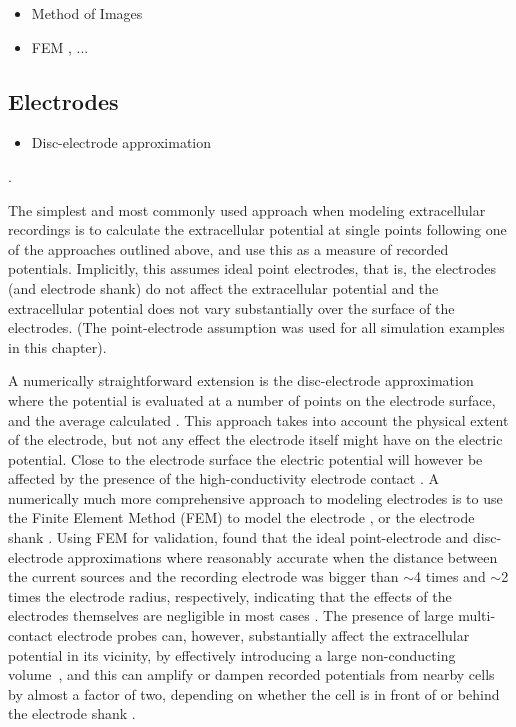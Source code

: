 \begin{itemize}
\item Method of Images \citep{Ness2015}
\item FEM \citep{Ness2015}, ...
\end{itemize}


\subsection{Electrodes}
\label{sec:electrode}
\begin{itemize}
\item Disc-electrode approximation
\end{itemize}
. 

The simplest and most commonly used approach when modeling extracellular recordings is to calculate the extracellular potential at single points following one of the approaches outlined above, and use this as a measure of recorded potentials. Implicitly, this assumes ideal point electrodes, that is, the electrodes (and electrode shank) do not affect the extracellular potential and the extracellular potential does not vary substantially over the surface of the electrodes. (The point-electrode assumption was used for all simulation examples in this chapter).

A numerically straightforward extension is the disc-electrode approximation where the potential is evaluated at a number of points on the electrode surface, and the average calculated \citep{ Linden2014}. 
This approach takes into account the physical extent of the electrode, but not any effect the electrode itself might have on the electric potential. 
Close to the electrode surface the electric potential will however be affected by the presence of the high-conductivity electrode contact \citep{McIntyre2001, Moulin2008}. A numerically much more comprehensive approach to modeling electrodes is to use the Finite Element Method (FEM) to model the electrode \citep{Moulin2008, Ness2015}, or the electrode shank \citep{Moffitt2005, Buccino2019b}. Using FEM for validation, \cite{Ness2015} found that the ideal point-electrode and disc-electrode approximations where reasonably accurate when the distance between the current sources and the recording electrode was bigger than $\sim$4 times and $\sim$2 times the electrode radius, respectively, indicating that the effects of the electrodes themselves are negligible in most cases \citep{Nelson2010}.
The presence of large multi-contact electrode probes can, however, substantially affect the extracellular potential in its vicinity, by effectively introducing a large non-conducting volume~\citep{Mechler2012}, and this can amplify or dampen recorded potentials from nearby cells by almost a factor of two, depending on whether the cell is in front of or behind the electrode shank \citep{Buccino2019b}.

